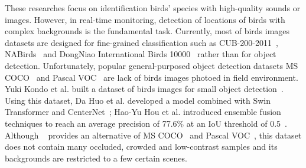 These researches focus on identification birds' species with 
high-quality sounds or images. However, in real-time monitoring, 
detection of locations of birds with complex backgrounds is the 
fundamental task. Currently, most of birds images datasets 
are designed for fine-grained classification such as CUB-200-2011~\cite{dataset1}, NABirds~\cite{dataset2} and DongNiao International Birds 10000~\cite{dataset3}
rather than for object detection. Unfortunately, 
popular general-purposed object detection datasets MS COCO~\cite{datasetcoco} and Pascal VOC~\cite{datasetvoc} 
are lack of birds images photoed in field environment.
Yuki Kondo et al. built a dataset of birds images for small object detection~\cite{datasetmva}.
Using this dataset, Da Huo et al. developed a model 
combined with Swin Transformer and CenterNet~;
Hao-Yu Hou et al. introduced ensemble fusion techniques to reach 
an average precision of 77.6\% at an IoU threshold of 0.5~\cite{Swint,centernet,mva1,mva2}.
Although ~\cite{datasetmva} provides an alternative of MS COCO~\cite{datasetcoco} and Pascal VOC~\cite{datasetvoc},
this dataset does not contain many occluded, crowded and low-contrast 
samples and its backgrounds are restricted to a few certain scenes.

